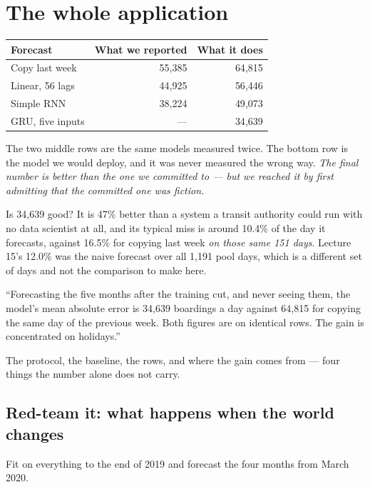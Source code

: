 \documentclass[11pt,a4paper]{article}
\begin{document}
\section{The whole application}

\begin{center}
\small
\begin{tabular}{lrr}
\toprule
\textbf{Forecast} & \textbf{What we reported} & \textbf{What it does} \\
\midrule
Copy last week & 55{,}385 & 64{,}815 \\
Linear, 56 lags & 44{,}925 & 56{,}446 \\
Simple RNN & 38{,}224 & 49{,}073 \\
GRU, five inputs & --- & 34{,}639 \\
\bottomrule
\end{tabular}
\end{center}

The two middle rows are the same models measured twice. The bottom row is the
model we would deploy, and it was never measured the wrong way. \emph{The final
number is better than the one we committed to --- but we reached it by first
admitting that the committed one was fiction.}

Is 34{,}639 good? It is 47\% better than a system a transit authority could run
with no data scientist at all, and its typical miss is around 10.4\% of the day
it forecasts, against 16.5\% for copying last week \emph{on those same 151
days}. Lecture 15's 12.0\% was the naive forecast over all 1{,}191 pool days,
which is a different set of days and not the comparison to make here.

\begin{keybox}[title={What a defensible report says}]
``Forecasting the five months after the training cut, and never seeing them,
the model's mean absolute error is 34{,}639 boardings a day against 64{,}815
for copying the same day of the previous week. Both figures are on identical
rows. The gain is concentrated on holidays.''

The protocol, the baseline, the rows, and where the gain comes from --- four
things the number alone does not carry.
\end{keybox}

\subsection{Red-team it: what happens when the world changes}

Fit on everything to the end of 2019 and forecast the four months from March
2020.
\end{document}
